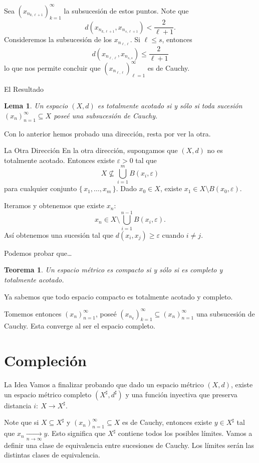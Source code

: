 \documentclass[utf8]{beamer}
\theoremstyle{plain}
\newtheorem{Th}{Teorema}               %
\newtheorem{Lem}{Lema}                 %
\theoremstyle{definition}
\theoremstyle{remark}
\numberwithin{equation}{section}
\newcommand{\eps}{\varepsilon}          %
\newcommand{\set}[1]{\{\,#1\,\}}    %
\renewcommand{\geq}{\geqslant}          %
\renewcommand{\l}{\ell}                   %
\renewcommand{\leq}{\leqslant}          %
\newcommand{\less}{\setminus}           %
\newcommand{\suck}{_{k=1}^\infty} %
\newcommand{\sucn}{_{n=1}^\infty} %
\begin{document}
\begin{frame}
  Sea $(x_{n_{k,\l+1}})\suck$ la subsucesión de estos puntos. Note que 
  $$d(x_{n_{k,\l+1}},x_{n_{s,\l+1}})<\frac{2}{\l+1}.$$
  Consideremos la subsucesión de los $x_{n_{\l,\l}}$. Si $\l\leq s$, entonces 
  $$d(x_{n_{\l,\l}},x_{n_{s,s}})\leq \frac{2}{\l+1}$$
  lo que nos permite concluir que $(x_{n_{\l,\l}})_{\l=1}^\infty$ es de Cauchy.
\end{frame}

\begin{frame}{El Resultado}
  \begin{Lem}\label{lem:caractParacompacidadCauchy}
  Un espacio $(X,d)$ es totalmente acotado si y sólo si toda sucesión $(x_n)\sucn\subseteq X$ poseé una subsucesión de Cauchy.
  \end{Lem}
  Con lo anterior hemos probado una dirección, resta por ver la otra.
\end{frame}

\begin{frame}{La Otra Dirección}
  En la otra dirección, supongamos que $(X,d)$ no es totalmente acotado. Entonces existe $\eps>0$ tal que
    $$X\not\subseteq \bigcup_{i=1}^m B(x_i,\eps)$$
    para cualquier conjunto $\set{x_1,\dots,x_m}$. Dado $x_0\in X$, existe $x_1\in X\less B(x_0,\eps)$.\par 
  Iteramos y obtenemos que existe $x_n$:
    $$x_n\in X\less \bigcup_{i=1}^{n-1}B(x_i,\eps).$$
    Así obtenemos una sucesión tal que $d(x_i,x_j)\geq \eps$ cuando $i\neq j$. 
\end{frame}

\begin{frame}{Podemos probar que\dots}
  \begin{Th}\label{thm:compactoIffCompletoYParacompacto}
    Un espacio métrico es compacto si y sólo si es completo y totalmente acotado.
  \end{Th}
  Ya sabemos que todo espacio compacto es totalmente acotado y completo.\par 
  Tomemos entonces $(x_n)\sucn$, poseé $(x_{n_k})\suck\subseteq(x_n)\sucn$ una subsucesión de Cauchy. Esta converge al ser el espacio completo. 
\end{frame}

\section{Compleción}

\begin{frame}{La Idea}
  Vamos a finalizar probando que dado un espacio métrico $(X,d)$, existe un espacio métrico completo $(X^\sharp,d^\sharp)$ y una función inyectiva que preserva distancia $i:\ X\to X^\sharp$.\par 
  Note que si $X\subseteq X^\sharp$ y $(x_n)\sucn\subseteq X$ es de Cauchy, entonces existe $y\in X^\sharp$ tal que $x_n\xrightarrow[n\to\infty]{}y$. Esto significa que $X^\sharp$ contiene todos los posibles límites. Vamos a definir una clase de equivalencia entre sucesiones de Cauchy. Los límites serán las distintas clases de equivalencia.
\end{frame}
\end{document}
